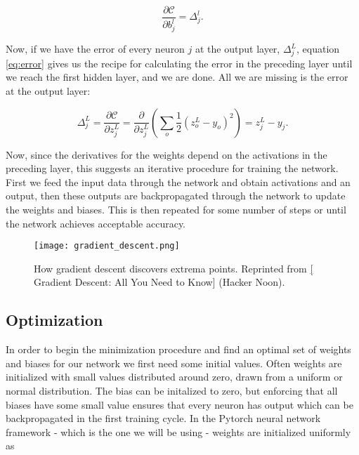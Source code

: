 \begin{equation}
 \frac{\partial \mathcal{C}}{\partial b_{j}^l} = \Delta_j^l .
\end{equation}

Now, if we have the error of every neuron $j$ at the output layer,
$\Delta_j^L$, equation \ref{eq:error}
gives us the recipe for calculating the error in the preceding layer until we reach the first hidden layer, 
and we are done. All we are missing is the error at the output layer:

\begin{equation}
\Delta_j^L = \frac{\partial \mathcal{C}}{\partial z_j^L} 
= \frac{\partial}{\partial z_j^L} \left(
    \sum_o \frac{1}{2}\left( z_o^L - y_o\right)^2 \right) 
    = z_j^L - y_j .
\end{equation}

Now, since the derivatives for the weights depend on
the activations in the preceding layer, this suggests
an iterative procedure for training the network.
First we feed the input data through the network
and obtain activations and an output, then these
outputs are backpropagated through the network to update the
weights and biases. This is then repeated for some number
of steps or until the network achieves acceptable accuracy.

\begin{figure}
    \centering
    \texttt{[image: gradient\_descent.png]}
    \caption{How gradient descent discovers extrema points.
    Reprinted from 
    \href{https://hackernoon.com/gradient-descent-aynk-7cbe95a778da}[
        Gradient Descent: All You Need to Know] (Hacker Noon).}
    \label{fig:gradient-descent}
\end{figure}

\subsection{Optimization}
In order to begin the minimization procedure and find an optimal
set of weights and biases for our network we first need some initial values.
Often weights are initialized with small values distributed around zero,
drawn from a uniform or normal distribution. The bias can be initalized to zero,
but enforcing that all biases have some small value ensures that every
neuron has output which can be backpropagated in the first training cycle.
In the Pytorch neural network framework - which is the one we will 
be using - weights are initialized uniformly as

